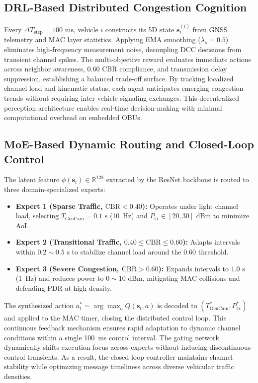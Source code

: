 \documentclass[journal]{IEEEtran}
\begin{document}
\subsection{DRL-Based Distributed Congestion Cognition}
Every $\Delta T_{\text{step}} = 100\text{ ms}$, vehicle $i$ constructs its 5D state $\mathbf{s}_t^{(i)}$ from GNSS telemetry and MAC layer statistics. Applying EMA smoothing ($\lambda_s = 0.5$) eliminates high-frequency measurement noise, decoupling DCC decisions from transient channel spikes. The multi-objective reward evaluates immediate actions across neighbor awareness, 0.60 CBR compliance, and transmission delay suppression, establishing a balanced trade-off surface. By tracking localized channel load and kinematic status, each agent anticipates emerging congestion trends without requiring inter-vehicle signaling exchanges. This decentralized perception architecture enables real-time decision-making with minimal computational overhead on embedded OBUs.

\subsection{MoE-Based Dynamic Routing and Closed-Loop Control}
The latent feature $\phi(\mathbf{s}_t) \in \mathbb{R}^{128}$ extracted by the ResNet backbone is routed to three domain-specialized experts:
\begin{itemize}
    \item \textbf{Expert 1 (Sparse Traffic, $\text{CBR} < 0.40$):} Operates under light channel load, selecting $T_{\text{GenCam}} = 0.1\text{ s}$ (10~Hz) and $P_{\text{tx}} \in [20, 30]\text{ dBm}$ to minimize AoI.
    \item \textbf{Expert 2 (Transitional Traffic, $0.40 \le \text{CBR} \le 0.60$):} Adapts intervals within $0.2\sim0.5\text{ s}$ to stabilize channel load around the 0.60 threshold.
    \item \textbf{Expert 3 (Severe Congestion, $\text{CBR} > 0.60$):} Expands intervals to $1.0\text{ s}$ (1~Hz) and reduces power to $0\sim10\text{ dBm}$, mitigating MAC collisions and defending PDR at high density.
\end{itemize}
The synthesized action $a_t^* = \arg\max_a Q(\mathbf{s}_t, a)$ is decoded to $(T_{\text{GenCam}}^*, P_{\text{tx}}^*)$ and applied to the MAC timer, closing the distributed control loop. This continuous feedback mechanism ensures rapid adaptation to dynamic channel conditions within a single 100~ms control interval. The gating network dynamically shifts execution focus across experts without inducing discontinuous control transients. As a result, the closed-loop controller maintains channel stability while optimizing message timeliness across diverse vehicular traffic densities.
\end{document}
